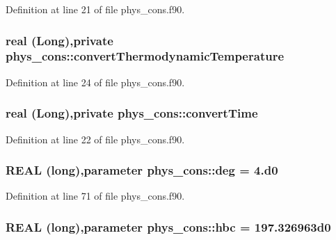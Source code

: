 Definition at line 21 of file phys\_\-cons.f90.

\hypertarget{namespacephys__cons_ae5f9a067db27ea13f6e4028d29900df0}{
\subsubsection[{convertThermodynamicTemperature}]{\setlength{\rightskip}{0pt plus 5cm}real (Long),private {\bf phys\_\-cons::convertThermodynamicTemperature}}}
\label{namespacephys__cons_ae5f9a067db27ea13f6e4028d29900df0}


Definition at line 24 of file phys\_\-cons.f90.

\hypertarget{namespacephys__cons_af758eccc104b85bbbc1974e3a9095849}{
\subsubsection[{convertTime}]{\setlength{\rightskip}{0pt plus 5cm}real (Long),private {\bf phys\_\-cons::convertTime}}}
\label{namespacephys__cons_af758eccc104b85bbbc1974e3a9095849}


Definition at line 22 of file phys\_\-cons.f90.

\hypertarget{namespacephys__cons_a553e3e17652770308e6bffcb8fcb5a95}{
\subsubsection[{deg}]{\setlength{\rightskip}{0pt plus 5cm}REAL (long),parameter {\bf phys\_\-cons::deg} = 4.d0}}
\label{namespacephys__cons_a553e3e17652770308e6bffcb8fcb5a95}


Definition at line 71 of file phys\_\-cons.f90.

\hypertarget{namespacephys__cons_a3f47589553abc71257ab3e88ef7bbb39}{
\subsubsection[{hbc}]{\setlength{\rightskip}{0pt plus 5cm}REAL (long),parameter {\bf phys\_\-cons::hbc} = 197.326963d0}}
\label{namespacephys__cons_a3f47589553abc71257ab3e88ef7bbb39}


